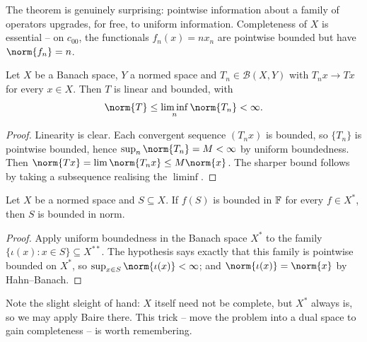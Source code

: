 \documentclass[a4paper]{scrartcl}
\newcommand{\Bop}{\mathcal{B}}
\begin{document}
The theorem is genuinely surprising: pointwise information about a family of operators upgrades, for free, to uniform information. Completeness of $X$ is essential -- on $c_{00}$, the functionals $f_n(x) = n x_n$ are pointwise bounded but have $\norm{f_n} = n$.

\begin{corollary}
	Let $X$ be a Banach space, $Y$ a normed space and $T_n \in \Bop(X,Y)$ with $T_n x \to Tx$ for every $x \in X$. Then $T$ is linear and bounded, with
	$$\norm{T} \leq \liminf_{n} \norm{T_n} < \infty.$$
\end{corollary}

\begin{proof}
	Linearity is clear. Each convergent sequence $(T_nx)$ is bounded, so $\{T_n\}$ is pointwise bounded, hence $\sup_n \norm{T_n} = M < \infty$ by uniform boundedness. Then $\norm{Tx} = \lim \norm{T_nx} \leq M\norm{x}$. The sharper bound follows by taking a subsequence realising the $\liminf$.
\end{proof}

\begin{corollary}
	Let $X$ be a normed space and $S \subseteq X$. If $f(S)$ is bounded in $\mathbb{F}$ for every $f \in X^*$, then $S$ is bounded in norm.
\end{corollary}

\begin{proof}
	Apply uniform boundedness in the Banach space $X^*$ to the family $\{\iota(x) : x \in S\} \subseteq X^{**}$. The hypothesis says exactly that this family is pointwise bounded on $X^*$, so $\sup_{x \in S}\norm{\iota(x)} < \infty$; and $\norm{\iota(x)} = \norm{x}$ by Hahn--Banach.
\end{proof}

Note the slight sleight of hand: $X$ itself need not be complete, but $X^*$ always is, so we may apply Baire there. This trick -- move the problem into a dual space to gain completeness -- is worth remembering.
\end{document}
